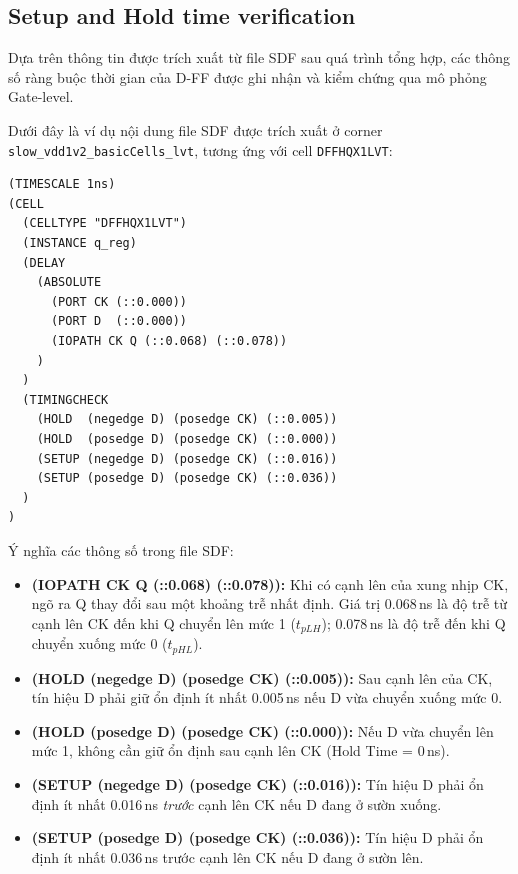 \documentclass[12pt, a4paper, oneside]{article}
\begin{document}
\subsection{Setup and Hold time verification}

Dựa trên thông tin được trích xuất từ file SDF sau quá trình tổng hợp, các thông số
ràng buộc thời gian của D-FF được ghi nhận và kiểm chứng qua mô phỏng Gate-level.

Dưới đây là ví dụ nội dung file SDF được trích xuất ở corner \texttt{slow\_vdd1v2\_basicCells\_lvt},
tương ứng với cell \texttt{DFFHQX1LVT}:

\begin{lstlisting}[style={prettyverilog}, caption={SDF}]
(TIMESCALE 1ns)
(CELL
  (CELLTYPE "DFFHQX1LVT")
  (INSTANCE q_reg)
  (DELAY
    (ABSOLUTE
      (PORT CK (::0.000))
      (PORT D  (::0.000))
      (IOPATH CK Q (::0.068) (::0.078))
    )
  )
  (TIMINGCHECK
    (HOLD  (negedge D) (posedge CK) (::0.005))
    (HOLD  (posedge D) (posedge CK) (::0.000))
    (SETUP (negedge D) (posedge CK) (::0.016))
    (SETUP (posedge D) (posedge CK) (::0.036))
  )
)
\end{lstlisting}

Ý nghĩa các thông số trong file SDF:
\begin{itemize}
    \item \textbf{(IOPATH CK Q (::0.068) (::0.078)):} Khi có cạnh lên của xung nhịp CK, ngõ
    ra Q thay đổi sau một khoảng trễ nhất định. Giá trị 0.068\,ns là độ trễ từ cạnh lên CK
    đến khi Q chuyển lên mức 1 ($t_{pLH}$); 0.078\,ns là độ trễ đến khi Q chuyển xuống mức
    0 ($t_{pHL}$).
    \item \textbf{(HOLD (negedge D) (posedge CK) (::0.005)):} Sau cạnh lên của CK, tín hiệu
    D phải giữ ổn định ít nhất 0.005\,ns nếu D vừa chuyển xuống mức 0.
    \item \textbf{(HOLD (posedge D) (posedge CK) (::0.000)):} Nếu D vừa chuyển lên mức 1,
    không cần giữ ổn định sau cạnh lên CK (Hold Time = 0\,ns).
    \item \textbf{(SETUP (negedge D) (posedge CK) (::0.016)):} Tín hiệu D phải ổn định ít
    nhất 0.016\,ns \emph{trước} cạnh lên CK nếu D đang ở sườn xuống.
    \item \textbf{(SETUP (posedge D) (posedge CK) (::0.036)):} Tín hiệu D phải ổn định ít
    nhất 0.036\,ns trước cạnh lên CK nếu D đang ở sườn lên.
\end{itemize}

\end{document}
